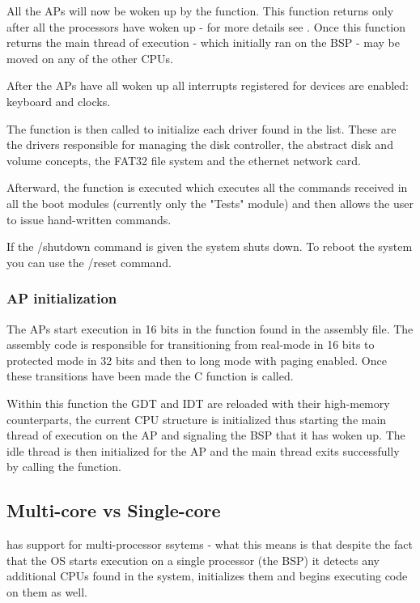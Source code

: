 \begin{appendices}
All the APs will now be woken up by the  function. This function returns only
after all the processors have woken up - for more details see . Once this
function returns the main thread of execution - which initially ran on the BSP - may be moved on
any of the other CPUs.

After the APs have all woken up all interrupts registered for devices are enabled: keyboard and
clocks.

The  function is then called to initialize each driver found in the
 list. These are the drivers responsible for managing the disk controller, the
abstract disk and volume concepts, the FAT32 file system and the ethernet network card.

Afterward, the  function is executed which executes all the commands received in all
the boot modules (currently only the "Tests" module) and then allows the user to issue hand-written
commands.

If the /shutdown command is given the system shuts down. To reboot the system you can use the /reset
command.

\subsubsection{AP initialization}
\label{sect:ApInit}

The APs start execution in 16 bits in the  function found in the
 assembly file. The assembly code is responsible for transitioning from
real-mode in 16 bits to protected mode in 32 bits and then to long mode with paging enabled. Once
these transitions have been made the  C function is called.

Within this function the GDT and IDT are reloaded with their high-memory counterparts, the current
CPU structure is initialized thus starting the main thread of execution on the AP and signaling the
BSP that it has woken up. The idle thread is then initialized for the AP and the main thread exits
successfully by calling the  function.

\subsection{Multi-core vs Single-core}
\label{sect:MultiCore}

\projectname has support  for multi-processor ssytems - what this means is that despite the fact 
that the OS starts execution on a single processor (the BSP) it detects any additional CPUs found in
the system, initializes them and begins executing code on them as well.


\end{appendices}
